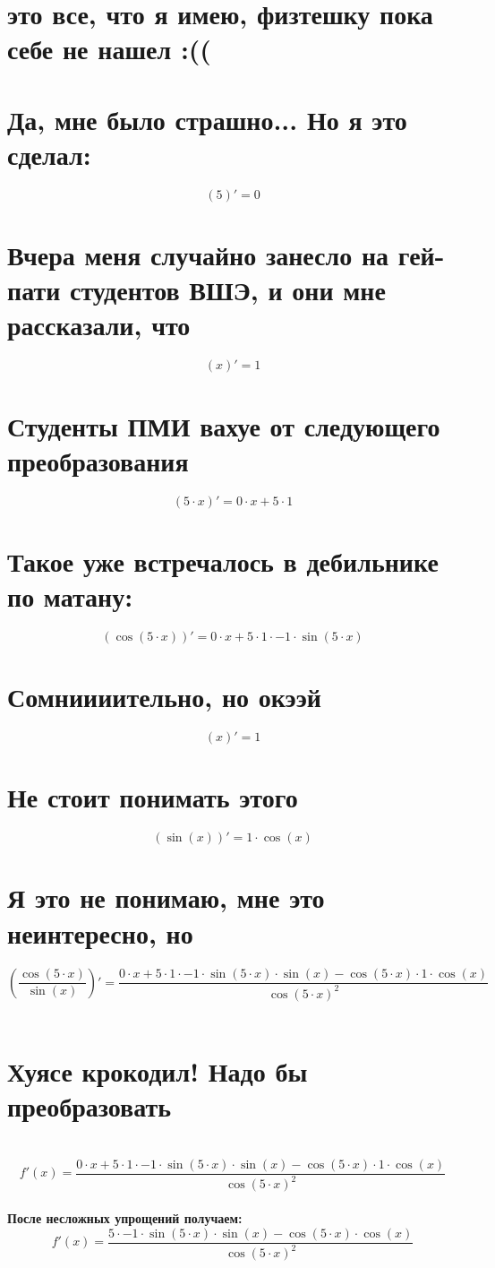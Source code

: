 \documentclass{article}
\begin{document}
\begin{Large}
\begin{onehalfspace}
\section*{это все, что я имею, физтешку пока себе не нашел :(( \\}\section*{Да, мне было страшно... Но я это сделал:}
$$(5)' = 0$$
\section*{Вчера меня случайно занесло на гей-пати студентов ВШЭ, и они мне рассказали, что}
$$(x)' = 1$$
\section*{Студенты ПМИ вахуе от следующего преобразования}
$$(5 \cdot x)' = 0 \cdot x + 5 \cdot 1$$
\section*{Такое уже встречалось в дебильнике по матану:}
$$(\cos(5 \cdot x))' = 0 \cdot x + 5 \cdot 1 \cdot -1 \cdot \sin(5 \cdot x)$$
\section*{Сомниииительно, но окээй}
$$(x)' = 1$$
\section*{Не стоит понимать этого}
$$(\sin(x))' = 1 \cdot \cos(x)$$
\section*{Я это не понимаю, мне это неинтересно, но}
$$(\frac{\cos(5 \cdot x)}{\sin(x)})' = \frac{0 \cdot x + 5 \cdot 1 \cdot -1 \cdot \sin(5 \cdot x) \cdot \sin(x) - \cos(5 \cdot x) \cdot 1 \cdot \cos(x)}{\cos(5 \cdot x)^{2}}$$
\hline \vspace{1cm} \\
\section*{Хуясе крокодил! Надо бы преобразовать}\\
$$ f'(x) = \frac{0 \cdot x + 5 \cdot 1 \cdot -1 \cdot \sin(5 \cdot x) \cdot \sin(x) - \cos(5 \cdot x) \cdot 1 \cdot \cos(x)}{\cos(5 \cdot x)^{2}}$$\\
\textbf{После несложных упрощений получаем: }\\
$$ f'(x) = \frac{5 \cdot -1 \cdot \sin(5 \cdot x) \cdot \sin(x) - \cos(5 \cdot x) \cdot \cos(x)}{\cos(5 \cdot x)^{2}}$$\\
\end{onehalfspace}
\end{Large}
\end{document}
